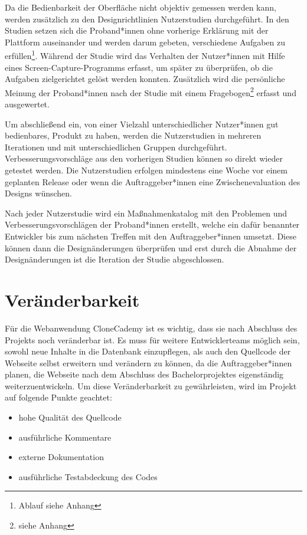 \documentclass[accentcolor=tud0b,12pt,paper=a4]{tudreport}
\begin{document}
Da die Bedienbarkeit der Oberfläche nicht objektiv gemessen werden kann, werden zusätzlich zu den Designrichtlinien Nutzerstudien durchgeführt. In den Studien setzen sich die Proband*innen ohne vorherige Erklärung mit der Plattform auseinander und werden darum gebeten, verschiedene Aufgaben zu erfüllen\footnote{Ablauf siehe Anhang}. Während der Studie wird das Verhalten der Nutzer*innen mit Hilfe eines Screen-Capture-Programms erfasst, um später zu überprüfen, ob die Aufgaben zielgerichtet gelöst werden konnten. Zusätzlich wird die persönliche Meinung der Proband*innen nach der Studie mit einem Fragebogen\footnote{siehe Anhang} erfasst und ausgewertet.

Um abschließend ein, von einer Vielzahl unterschiedlicher Nutzer*innen gut bedienbares, Produkt zu haben, werden die Nutzerstudien in mehreren Iterationen und mit unterschiedlichen Gruppen durchgeführt. Verbesserungsvorschläge aus den vorherigen Studien können so direkt wieder getestet werden. Die Nutzerstudien erfolgen mindestens eine Woche vor einem geplanten Release oder wenn die Auftraggeber*innen eine Zwischenevaluation des Designs wünschen.

Nach jeder Nutzerstudie wird ein Maßnahmenkatalog mit den Problemen und Verbesserungsvorschlägen der Proband*innen erstellt, welche ein dafür benannter Entwickler bis zum nächsten Treffen mit den Auftraggeber*innen umsetzt. Diese können dann die Designänderungen überprüfen und erst durch die Abnahme der Designänderungen ist die Iteration der Studie abgeschlossen.


\section{Veränderbarkeit}
Für die Webanwendung CloneCademy ist es wichtig, dass sie nach Abschluss des Projekts noch veränderbar ist. Es muss für weitere Entwicklerteams möglich sein, sowohl neue Inhalte in die Datenbank einzupflegen, als auch den Quellcode der Webseite selbst erweitern und verändern zu können, da die Auftraggeber*innen planen, die Webseite nach dem Abschluss des Bachelorprojektes eigenständig weiterzuentwickeln.
\pagebreak
Um diese Veränderbarkeit zu gewährleisten, wird im Projekt auf folgende Punkte geachtet:
\begin{itemize}
	\item hohe Qualität des Quellcode
	\item ausführliche Kommentare
	\item externe Dokumentation
	\item ausführliche Testabdeckung des Codes
\end{itemize}
\end{document}
